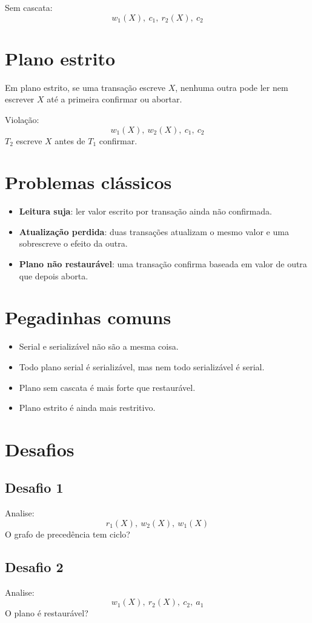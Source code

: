 \documentclass[12pt,a4paper]{article}
\begin{document}
Sem cascata:
\[
w_1(X),\ c_1,\ r_2(X),\ c_2
\]

\section{Plano estrito}
Em plano estrito, se uma transação escreve $X$, nenhuma outra pode ler nem escrever $X$ até a primeira confirmar ou abortar.

Violação:
\[
w_1(X),\ w_2(X),\ c_1,\ c_2
\]
$T_2$ escreve $X$ antes de $T_1$ confirmar.

\section{Problemas clássicos}
\begin{itemize}
    \item \textbf{Leitura suja}: ler valor escrito por transação ainda não confirmada.
    \item \textbf{Atualização perdida}: duas transações atualizam o mesmo valor e uma sobrescreve o efeito da outra.
    \item \textbf{Plano não restaurável}: uma transação confirma baseada em valor de outra que depois aborta.
\end{itemize}

\section{Pegadinhas comuns}
\begin{itemize}
    \item Serial e serializável não são a mesma coisa.
    \item Todo plano serial é serializável, mas nem todo serializável é serial.
    \item Plano sem cascata é mais forte que restaurável.
    \item Plano estrito é ainda mais restritivo.
\end{itemize}

\section{Desafios}
\subsection*{Desafio 1}
Analise:
\[
r_1(X),\ w_2(X),\ w_1(X)
\]
O grafo de precedência tem ciclo?

\subsection*{Desafio 2}
Analise:
\[
w_1(X),\ r_2(X),\ c_2,\ a_1
\]
O plano é restaurável?
\end{document}
